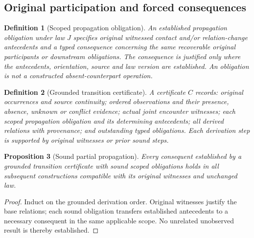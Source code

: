 \documentclass[11pt]{article}
\newtheorem{definition}{Definition}[section]
\newtheorem{proposition}[definition]{Proposition}
\begin{document}
\subsection{Original participation and forced consequences}
\begin{definition}[Scoped propagation obligation]
An established propagation obligation under law $J$
specifies original witnessed contact and/or relation-change
antecedents and a typed consequence concerning the same
recoverable original participants or downstream obligations.
The consequence is justified only where the antecedents,
orientation, source and law version are established.
An obligation is not a constructed absent-counterpart operation.
\end{definition}

\begin{definition}[Grounded transition certificate]
A certificate $C$ records: original occurrences and
source continuity; ordered observations and their
presence, absence, unknown or conflict evidence;
actual joint encounter witnesses; each scoped
propagation obligation and its determining antecedents;
all derived relations with provenance; and outstanding
typed obligations. Each derivation step is supported
by original witnesses or prior sound steps.
\end{definition}

\begin{proposition}[Sound partial propagation]
Every consequent established by a grounded transition
certificate with sound scoped obligations holds in all
subsequent constructions compatible with its original
witnesses and unchanged law.
\end{proposition}
\begin{proof}
Induct on the grounded derivation order. Original
witnesses justify the base relations; each sound
obligation transfers established antecedents to a
necessary consequent in the same applicable scope.
No unrelated unobserved result is thereby established.
\end{proof}
\end{document}
